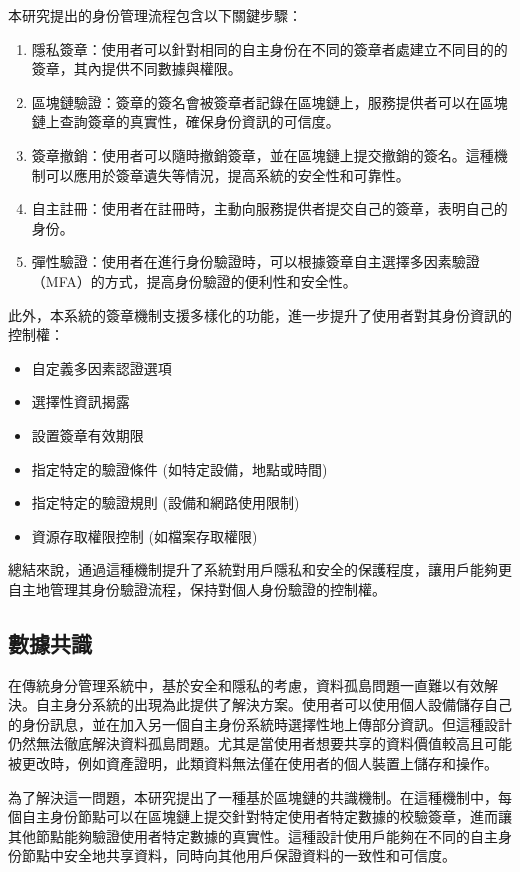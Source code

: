 本研究提出的身份管理流程包含以下關鍵步驟：
\begin{enumerate}
  \item 隱私簽章：使用者可以針對相同的自主身份在不同的簽章者處建立不同目的的簽章，其內提供不同數據與權限。
  \item 區塊鏈驗證：簽章的簽名會被簽章者記錄在區塊鏈上，服務提供者可以在區塊鏈上查詢簽章的真實性，確保身份資訊的可信度。
  \item 簽章撤銷：使用者可以隨時撤銷簽章，並在區塊鏈上提交撤銷的簽名。這種機制可以應用於簽章遺失等情況，提高系統的安全性和可靠性。
  \item 自主註冊：使用者在註冊時，主動向服務提供者提交自己的簽章，表明自己的身份。
  \item 彈性驗證：使用者在進行身份驗證時，可以根據簽章自主選擇多因素驗證（MFA）的方式，提高身份驗證的便利性和安全性。
\end{enumerate}
此外，本系統的簽章機制支援多樣化的功能，進一步提升了使用者對其身份資訊的控制權：
\begin{itemize}
  \item 自定義多因素認證選項
  \item 選擇性資訊揭露
  \item 設置簽章有效期限
  \item 指定特定的驗證條件 (如特定設備，地點或時間)
  \item 指定特定的驗證規則 (設備和網路使用限制)
  \item 資源存取權限控制 (如檔案存取權限)
\end{itemize}

總結來說，通過這種機制提升了系統對用戶隱私和安全的保護程度，讓用戶能夠更自主地管理其身份驗證流程，保持對個人身份驗證的控制權。
\subsection{數據共識}
在傳統身分管理系統中，基於安全和隱私的考慮，資料孤島問題一直難以有效解決。自主身分系統的出現為此提供了解決方案。使用者可以使用個人設備儲存自己的身份訊息，並在加入另一個自主身份系統時選擇性地上傳部分資訊。但這種設計仍然無法徹底解決資料孤島問題。尤其是當使用者想要共享的資料價值較高且可能被更改時，例如資產證明，此類資料無法僅在使用者的個人裝置上儲存和操作。

為了解決這一問題，本研究提出了一種基於區塊鏈的共識機制。在這種機制中，每個自主身份節點可以在區塊鏈上提交針對特定使用者特定數據的校驗簽章，進而讓其他節點能夠驗證使用者特定數據的真實性。這種設計使用戶能夠在不同的自主身份節點中安全地共享資料，同時向其他用戶保證資料的一致性和可信度。


